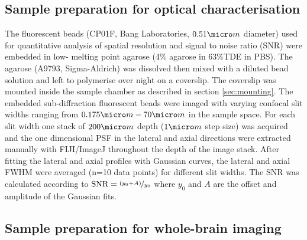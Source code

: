 \documentclass[12pt]{spieman}  %
\begin{document}
\begin{spacing}{2}
\subsection{Sample preparation for optical characterisation}

The fluorescent beads (CP01F, Bang Laboratories, $0.51 \micro m$ diameter) used for quantitative analysis of spatial resolution and signal to noise ratio (SNR) were embedded in low- melting point agarose (4\% agarose in 63\%TDE in PBS). The agarose (A9793, Sigma-Aldrich) was dissolved then mixed with a diluted bead solution and left to polymerise over night on a coverslip. The coverslip was mounted inside the sample chamber as described in section \ref{sec:mounting}. The embedded sub-diffraction fluorescent beads were imaged with varying confocal slit widths ranging from $0.175 \micro m-70 \micro m$ in the sample space. For each slit width one stack of $200\micro m$ depth ($1 \micro m$ step size) was acquired and the one dimensional PSF in the lateral and axial directions were extracted manually with FIJI/ImageJ throughout the depth of the image stack. After fitting the lateral and axial profiles with Gaussian curves, the lateral and axial FWHM were averaged (n=10 data points) for different slit widths. The SNR was calculated according to $\text{SNR} = \nicefrac{(y_0 + A)}{y_0}$ where $y_0$ and $A$ are the offset and amplitude of the Gaussian fits.

\subsection{Sample preparation for whole-brain imaging}


\end{spacing}
\end{document}
